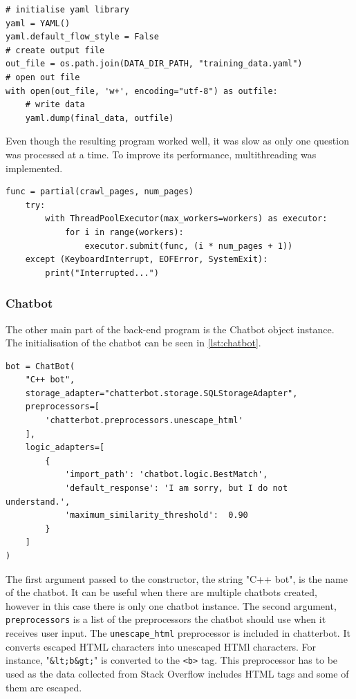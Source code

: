 \documentclass[12pt,a4paper]{article}
\newcommand{\captionstyle}[1] {
    \small{#1}
}
\begin{document}
\begin{lstlisting}[caption={\captionstyle{Writing scraped data to a file in the YAML format.}}, label={lst:write-file}]
# initialise yaml library
yaml = YAML()
yaml.default_flow_style = False
# create output file
out_file = os.path.join(DATA_DIR_PATH, "training_data.yaml")
# open out file
with open(out_file, 'w+', encoding="utf-8") as outfile:
    # write data
    yaml.dump(final_data, outfile)    
\end{lstlisting}

Even though the resulting program worked well, it was slow as only one question was processed at a time. To improve its performance, multithreading was implemented.

\begin{lstlisting}[caption={\captionstyle{Multithreaded optimisation of the web crawler.}}, label={lst:threads}]
    func = partial(crawl_pages, num_pages)
    try:
        with ThreadPoolExecutor(max_workers=workers) as executor:
            for i in range(workers):
                executor.submit(func, (i * num_pages + 1))
    except (KeyboardInterrupt, EOFError, SystemExit):
        print("Interrupted...")
\end{lstlisting}

\subsubsection{Chatbot}
The other main part of the back-end program is the Chatbot object instance. The initialisation of the chatbot can be seen in \cref{lst:chatbot}.

\begin{lstlisting}[caption={\captionstyle{Initialisation of the Chatbot object.}}, label={lst:chatbot}]
bot = ChatBot(
    "C++ bot",
    storage_adapter="chatterbot.storage.SQLStorageAdapter",
    preprocessors=[
        'chatterbot.preprocessors.unescape_html'
    ],
    logic_adapters=[
        {
            'import_path': 'chatbot.logic.BestMatch',
            'default_response': 'I am sorry, but I do not understand.',
            'maximum_similarity_threshold':  0.90
        }
    ]
)
\end{lstlisting}

The first argument passed to the constructor, the string "C++ bot", is the name of the chatbot. It can be useful when there are multiple chatbots created, however in this case there is only one chatbot instance. The second argument, \texttt{preprocessors} is a list of the preprocessors the chatbot should use when it receives user input. The \texttt{unescape\_html} preprocessor is included in chatterbot. It converts escaped HTML characters into unescaped HTMl characters. For instance, "\texttt{\&lt;b\&gt;}" is converted to the \texttt{<b>} tag. This preprocessor has to be used as the data collected from Stack Overflow includes HTML tags and some of them are escaped.
\end{document}
